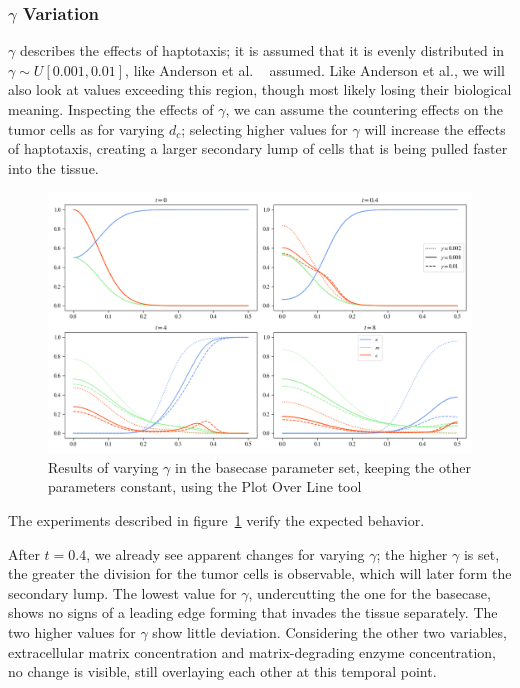 \subsubsection*{$\gamma$ Variation}
$\gamma$ describes the effects of haptotaxis; it is assumed that it is evenly distributed in $\gamma \sim U[0.001,0.01]$, like Anderson et al. ~\cite{anderson_mathematical_2000} assumed. Like Anderson et al., we will also look at values exceeding this region, though most likely losing their biological meaning. Inspecting the effects of $\gamma$, we can assume the countering effects on the tumor cells as for varying $d_c$; selecting higher values for $\gamma$ will increase the effects of haptotaxis, creating a larger secondary lump of cells that is being pulled faster into the tissue.
\begin{figure}[h!]
 \centering
 \includegraphics[width=\textwidth]{resources/images/gamma_variation.png}
 \caption{Results of varying $\gamma$ in the basecase parameter set, keeping the other parameters constant, using the Plot Over Line tool}
 \label{fig:gamma_variation}
\end{figure}
The experiments described in figure~\ref{fig:gamma_variation} verify the expected behavior.

After $t=0.4$, we already see apparent changes for varying $\gamma$; the higher $\gamma$ is set, the greater the division for the tumor cells is observable, which will later form the secondary lump. The lowest value for $\gamma$, undercutting the one for the basecase, shows no signs of a leading edge forming that invades the tissue separately. The two higher values for $\gamma$ show little deviation. Considering the other two variables, extracellular matrix concentration and matrix-degrading enzyme concentration, no change is visible, still overlaying each other at this temporal point.

